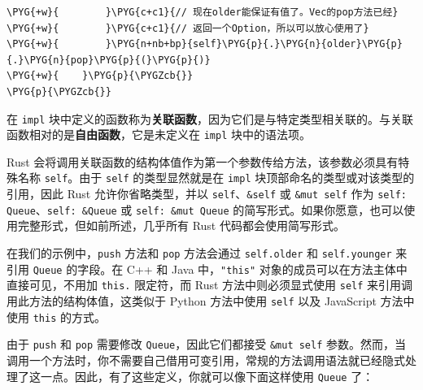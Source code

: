 \begin{Verbatim}[commandchars=\\\{\},breaklines=true,breakanywhere=true,fontsize=\codefont,xleftmargin=17bp]
\PYG{+w}{        }\PYG{c+c1}{// 现在older能保证有值了。Vec的pop方法已经}
\PYG{+w}{        }\PYG{c+c1}{// 返回一个Option，所以可以放心使用了}
\PYG{+w}{        }\PYG{n+nb+bp}{self}\PYG{p}{.}\PYG{n}{older}\PYG{p}{.}\PYG{n}{pop}\PYG{p}{(}\PYG{p}{)}
\PYG{+w}{    }\PYG{p}{\PYGZcb{}}
\PYG{p}{\PYGZcb{}}
\end{Verbatim}

在 \texttt{impl} 块中定义的函数称为\textbf{关联函数}，因为它们是与特定类型相关联的。与关联函数相对的是\textbf{自由函数}，它是未定义在 \texttt{impl} 块中的语法项。

Rust 会将调用关联函数的结构体值作为第一个参数传给方法，该参数必须具有特殊名称 \texttt{self}。由于 \texttt{self} 的类型显然就是在 \texttt{impl} 块顶部命名的类型或对该类型的引用，因此 Rust 允许你省略类型，并以 \texttt{self}、\texttt{\&self} 或 \texttt{\&mut self} 作为 \texttt{self: Queue}、\texttt{self: \&Queue} 或 \texttt{self: \&mut Queue} 的简写形式。如果你愿意，也可以使用完整形式，但如前所述，几乎所有 Rust 代码都会使用简写形式。

在我们的示例中，\texttt{push} 方法和 \texttt{pop} 方法会通过 \texttt{self.older} 和 \texttt{self.younger} 来引用 \texttt{Queue} 的字段。在 C++ 和 Java 中，\texttt{"this"} 对象的成员可以在方法主体中直接可见，不用加 \texttt{this.} 限定符，而 Rust 方法中则必须显式使用 \texttt{self} 来引用调用此方法的结构体值，这类似于 Python 方法中使用 \texttt{self} 以及 JavaScript 方法中使用 \texttt{this} 的方式。

由于 \texttt{push} 和 \texttt{pop} 需要修改 \texttt{Queue}，因此它们都接受 \texttt{\&mut self} 参数。然而，当调用一个方法时，你不需要自己借用可变引用，常规的方法调用语法就已经隐式处理了这一点。因此，有了这些定义，你就可以像下面这样使用 \texttt{Queue} 了：

